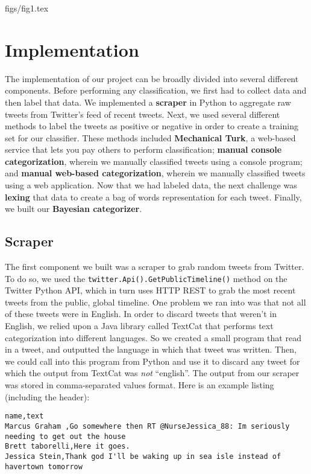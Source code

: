 \documentclass[12pt,a4paper]{article}
\begin{document}
 { figs/fig1.tex }

\section{ Implementation }

The implementation of our project can be broadly divided into several different components. Before performing any classification, we first had to collect data and then label that data. We implemented a \textbf{scraper} in Python to aggregate raw tweets from Twitter's feed of recent tweets. Next, we used several different methods to label the tweets as positive or negative in order to create a training set for our classifier. These methods included \textbf{Mechanical Turk}, a web-based service that lets you pay others to perform classification; \textbf{manual console categorization}, wherein we manually classified tweets using a console program; and \textbf{manual web-based categorization}, wherein we manually classified tweets using a web application. Now that we had labeled data, the next challenge was \textbf{lexing} that data to create a bag of words representation for each tweet. Finally, we built our \textbf{Bayesian categorizer}.

\subsection { Scraper }

The first component we built was a scraper to grab random tweets from Twitter. To do so, we used the \texttt{twitter.Api().GetPublicTimeline()} method on the Twitter Python API, which in turn uses HTTP REST to grab the most recent tweets from the public, global timeline. One problem we ran into was that not all of these tweets were in English. In order to discard tweets that weren't in English, we relied upon a Java library called TextCat that performs text categorization into different languages. So we created a small program that read in a tweet, and outputted the language in which that tweet was written. Then, we could call into this program from Python and use it to discard any tweet for which the output from TextCat was \emph{not} ``english''. The output from our scraper was stored in comma-separated values format. Here is an example listing (including the header):

\begin{verbatim}
name,text
Marcus Graham ,Go somewhere then RT @NurseJessica_88: Im seriously needing to get out the house
Brett taborelli,Here it goes.
Jessica Stein,Thank god I'll be waking up in sea isle instead of havertown tomorrow
\end{verbatim}
\end{document}
